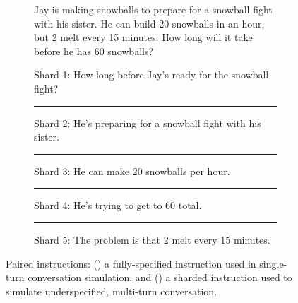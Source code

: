 \documentclass{article}
\begin{document}
\begin{figure}[t]
  \centering

  \begin{subfigure}[t]{0.38\textwidth}
    \centering
    \begin{tcolorbox}[title=Fully-Specified Instruction (original),colframe=coolblue,colback=coolblue!5,fontupper=\linespread{1.1}\selectfont]
    Jay is making snowballs to prepare for a snowball fight with his sister. He can build 20 snowballs in an hour, but 2 melt every 15 minutes. How long will it take before he has 60 snowballs?
    \end{tcolorbox}
    \label{sfig:fully_specified_instruction}
  \end{subfigure}
  \hfill
\begin{subfigure}[t]{0.58\textwidth}
    \centering
    \begin{tcolorbox}[title=Sharded Instruction (based on original), colframe=warmgold, colback=warmgold!5, boxsep=1mm, left=1mm, right=1mm, top=1mm, bottom=1mm]
    Shard 1: How long before Jay’s ready for the snowball fight?

\vspace{-2mm}
\color{warmgold} \rule{\linewidth}{0.4pt}\color{black}

Shard 2: He’s preparing for a snowball fight with his sister.

\vspace{-2mm}
\color{warmgold} \rule{\linewidth}{0.4pt}\color{black}

Shard 3: He can make 20 snowballs per hour.

\vspace{-2mm}
\color{warmgold} \rule{\linewidth}{0.4pt}\color{black}

Shard 4: He’s trying to get to 60 total.

\vspace{-2mm}

\color{warmgold} \rule{\linewidth}{0.4pt}\color{black}

Shard 5: The problem is that 2 melt every 15 minutes.

\vspace{-0.5mm}
\end{tcolorbox}
\label{sfig:sharded_instruction}
\end{subfigure}

\caption{Paired instructions: () a fully-specified instruction used in single-turn conversation simulation, and () a sharded instruction used to simulate underspecified, multi-turn conversation.}
\label{fig:sharding_example}
\end{figure}
\end{document}
